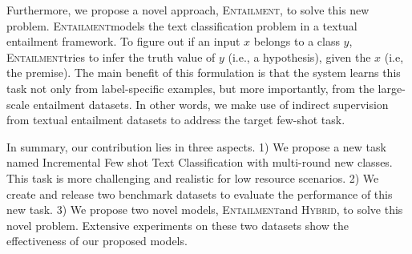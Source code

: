 \documentclass[11pt]{article}
\newcommand{\modelname}{\textsc{Entailment}}
\newcommand{\hybrid}{\textsc{Hybrid}}
\begin{document}

Furthermore, we propose a novel approach, \modelname, to solve this new problem. \modelname\enspace models the text classification problem in a textual entailment \cite{dagan2013recognizing} framework. To figure out if an input $x$ belongs to a class $y$, \modelname\enspace tries to infer the truth value of $y$ (i.e., a hypothesis), given the $x$ (i.e, the premise). The main benefit of this formulation is that the system learns this task not only from label-specific examples, but more importantly, from the large-scale entailment datasets. In other words, we make use of indirect supervision from textual entailment datasets to address the target few-shot task. 

In summary, our contribution lies in three aspects. 1) We propose a new task named Incremental Few shot Text Classification with multi-round new classes. This task is more challenging and realistic for low resource scenarios. 2) We create and release two benchmark datasets to evaluate the performance of this new task. 3) We propose two novel models, \modelname\enspace and \hybrid, to solve this novel problem. Extensive experiments on these two datasets show the effectiveness of our proposed models.
\end{document}
